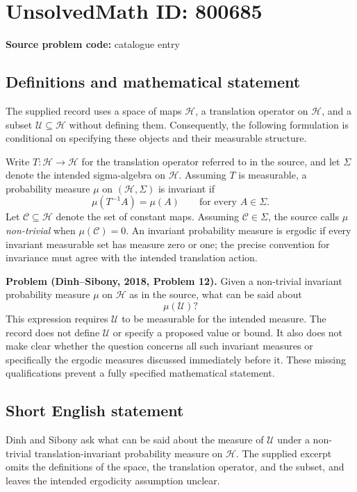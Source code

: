 \documentclass[11pt]{article}
\begin{document}
\section*{UnsolvedMath ID: 800685}
\textbf{Source problem code:} catalogue entry
\subsection{Definitions and mathematical statement}
The supplied record uses a space of maps $\mathscr{H}$, a translation operator on $\mathscr{H}$, and a subset $\mathscr{U}\subseteq\mathscr{H}$ without defining them. Consequently, the following formulation is conditional on specifying these objects and their measurable structure.

Write $T:\mathscr{H}\to\mathscr{H}$ for the translation operator referred to in the source, and let $\Sigma$ denote the intended sigma-algebra on $\mathscr{H}$. Assuming $T$ is measurable, a probability measure $\mu$ on $(\mathscr{H},\Sigma)$ is invariant if
\[
\mu(T^{-1}A)=\mu(A)\qquad\text{for every }A\in\Sigma.
\]
Let $\mathscr{C}\subseteq\mathscr{H}$ denote the set of constant maps. Assuming $\mathscr{C}\in\Sigma$, the source calls $\mu$ \emph{non-trivial} when $\mu(\mathscr{C})=0$. An invariant probability measure is ergodic if every invariant measurable set has measure zero or one; the precise convention for invariance must agree with the intended translation action.

\textbf{Problem (Dinh--Sibony, 2018, Problem 12).} Given a non-trivial invariant probability measure $\mu$ on $\mathscr{H}$ as in the source, what can be said about
\[
\mu(\mathscr{U})?
\]
This expression requires $\mathscr{U}$ to be measurable for the intended measure. The record does not define $\mathscr{U}$ or specify a proposed value or bound. It also does not make clear whether the question concerns all such invariant measures or specifically the ergodic measures discussed immediately before it. These missing qualifications prevent a fully specified mathematical statement.
\subsection{Short English statement}
Dinh and Sibony ask what can be said about the measure of $\mathscr{U}$ under a non-trivial translation-invariant probability measure on $\mathscr{H}$. The supplied excerpt omits the definitions of the space, the translation operator, and the subset, and leaves the intended ergodicity assumption unclear.
\end{document}

